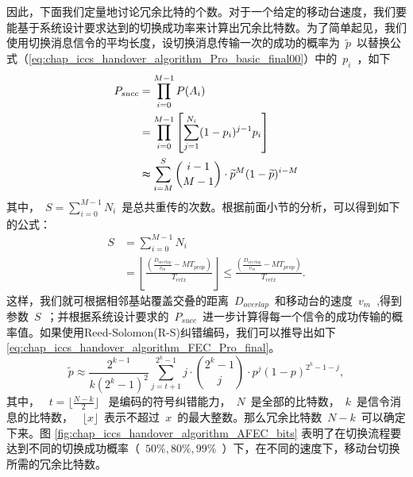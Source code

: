 因此，下面我们定量地讨论冗余比特的个数。对于一个给定的移动台速度，我们要能基于系统设计要求达到的切换成功率来计算出冗余比特数。为了简单起见，我们使用切换消息信令的平均长度，设切换消息传输一次的成功的概率为~$\tilde{p}$~以替换公式（\ref{eq:chap_iccs_handover_algorithm_Pro_basic_final00}）中的~$p_i$~，如下
\begin{align}
\notag P_{succ} &= \prod_{i=0}^{M-1}P(A_{i})\\
&= \prod_{i=0}^{M-1}\left[\sum_{j=1}^{N_{i}}(1-p_{i})^{j-1}p_{i}\right]\\
\notag &\thickapprox\sum_{i=M}^{S}{i-1 \choose M-1}\cdot\widetilde{p}^{M}(1-\widetilde{p})^{i-M}
\end{align}
其中，~$S=\sum_{i=0}^{M-1}N_{i}$~是总共重传的次数。根据前面小节的分析，可以得到如下的公式：
\begin{align*}
S & = \sum_{i=0}^{M-1}N_{i}\\
  & = \left\lfloor \frac{(\frac{D_{overlap}}{v_{m}}-MT_{prop})}
        {T_{retx}}\right\rfloor \leq\frac{(\frac{D_{overlap}}{v_{m}}
        -MT_{prop})}{T_{retx}}.
\end{align*}
这样，我们就可根据相邻基站覆盖交叠的距离~$D_{overlap}$~和移动台的速度~$v_m$~,得到参数~$S$~；并根据系统设计要求的~$P_{succ}$~进一步计算得每一个信令的成功传输的概率值。如果使用Reed-Solomon(R-S)纠错编码，我们可以推导出如下\eqref{eq:chap_iccs_handover_algorithm_FEC_Pro_final}。
\begin{equation}\label{eq:chap_iccs_handover_algorithm_FEC_Pro_final}
\tilde{p}\approx\frac{2^{k-1}}{k(2^{k}-1)^{2}}\sum_{j=t+1}^{2^{k}-1}j
\cdot{2^{k}-1\choose j}_{}^{}\cdot p^{j}(1-p)^{2^{k}-1-j},
\end{equation}
其中， ~$t=\lfloor\frac{N-k}{2}\rfloor$~ 是编码的符号纠错能力，~$N$~是全部的比特数，~$k$~是信令消息的比特数， ~$\lfloor{x}\rfloor$~表示不超过~$x$~的最大整数。那么冗余比特数~$N-k$~可以确定下来。图 \ref{fig:chap_iccs_handover_algorithm_AFEC_bits} 表明了在切换流程要达到不同的切换成功概率（~$50\%,80\%,99\%$~）下，在不同的速度下，移动台切换所需的冗余比特数。
